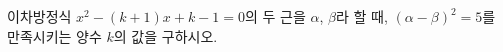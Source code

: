 이차방정식 $x^2-(k+1)x+k-1=0$의 두 근을 $\alpha$, $\beta$라 할 때, $(\alpha-\beta)^2=5$를 만족시키는 양수 $k$의 값을 구하시오.
